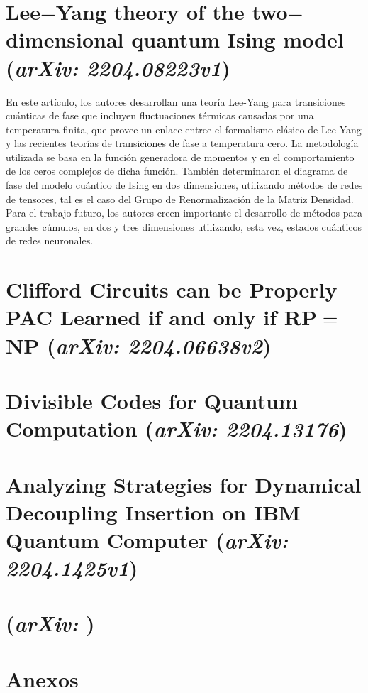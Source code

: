 \section{Lee$-$Yang theory of the two$-$dimensional quantum Ising model (\textit{arXiv: 2204.08223v1})}
\justify
En este artículo, los autores desarrollan una teoría Lee-Yang para transiciones cuánticas de fase que incluyen fluctuaciones térmicas causadas por una temperatura finita, que provee un enlace entree el formalismo clásico de Lee-Yang y las recientes teorías de transiciones de fase a temperatura cero. La metodología utilizada se basa en la función generadora de momentos y en el comportamiento de los ceros complejos de dicha función. También determinaron el diagrama de fase del modelo cuántico de Ising en dos dimensiones, utilizando métodos de redes de tensores, tal es el caso del Grupo de Renormalización de la Matriz Densidad. Para el trabajo futuro, los autores creen importante el desarrollo de métodos para grandes cúmulos, en dos y tres dimensiones utilizando, esta vez, estados cuánticos de redes neuronales.

\section{Clifford Circuits can be Properly PAC Learned if and only if \textbf{RP}$=$\textbf{NP} (\textit{arXiv: 2204.06638v2})}
\justify
\lipsum[1]

\section{Divisible Codes for Quantum Computation (\textit{arXiv: 2204.13176})}
\justify
\lipsum[1]

\section{Analyzing Strategies for Dynamical Decoupling Insertion on IBM Quantum Computer (\textit{arXiv: 2204.1425v1})}
\justify
\lipsum[1]

\section{ (\textit{arXiv: })}
\justify
\lipsum[1]


\section{Anexos}
\label{sec:anexos}



